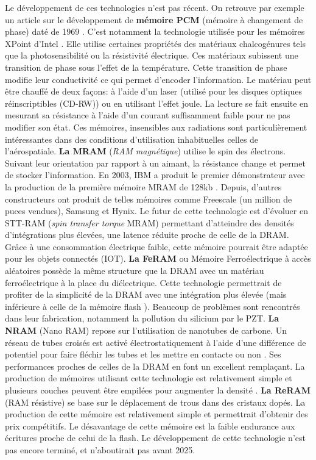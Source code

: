         Le développement de ces technologies n'est pas récent. On retrouve par exemple un article sur le développement de \textbf{mémoire PCM} (mémoire à changement de phase) daté de 1969 \cite{Sie1969}. C'est notamment la technologie utilisée pour les mémoires XPoint d'Intel \cite{Handy2015}. Elle utilise certaines propriétés des matériaux chalcogénures tels que la photosensibilité ou la résistivité électrique. Ces matériaux subissent une transition de phase sous l'effet de la température. Cette transition de phase modifie leur conductivité ce qui permet d'encoder l'information. Le matériau peut être chauffé de deux façons: à l'aide d'un laser (utilisé pour les disques optiques réinscriptibles (CD-RW)) ou en utilisant l'effet joule. La lecture se fait ensuite en mesurant sa résistance à l'aide d'un courant suffisamment faible pour ne pas modifier son état. Ces mémoires, insensibles aux radiations sont particulièrement intéressantes dans des conditions d'utilisation inhabituelles celles de l'aérospatiale. \textbf{La MRAM} (\textit{RAM magnétique}) utilise le spin des électrons.  Suivant leur orientation par rapport à un aimant, la résistance change et permet de stocker l'information. En 2003, IBM a produit le premier démonstrateur avec la production de la première mémoire MRAM de 128kb  \cite{Bette2003}. Depuis, d'autres constructeurs ont produit de telles mémoires comme Freescale (un million de puces vendues), Samsung et Hynix. Le futur de cette technologie est d'évoluer en STT-RAM \cite{Alvarez-Herault2010} (\textit{spin transfer torque} MRAM) permettant d'atteindre des densités d'intégrations plus élevées, une latence réduite proche de celle de la DRAM. Grâce à une consommation électrique faible, cette mémoire pourrait être adaptée pour les objets connectés (IOT). \textbf{La FeRAM} ou Mémoire Ferroélectrique à accès aléatoires possède la même structure que la DRAM avec un matériau ferroélectrique à la place du diélectrique. Cette technologie permettrait de profiter de la simplicité de la DRAM avec une intégration plus élevée (mais inférieure à celle de la mémoire flash \cite{Alvarez-Herault2010}). Beaucoup de problèmes sont rencontrés dans leur fabrication, notamment la pollution du silicium par le PZT. \textbf{La NRAM} (Nano RAM) repose sur l'utilisation de nanotubes de carbone. Un réseau de tubes croisés est activé électrostatiquement à l'aide d'une différence de potentiel pour faire fléchir les tubes et les mettre en contacte ou non \cite{Ricart2008}. Ses performances proches de celles de la DRAM en font un excellent remplaçant. La production de mémoires utilisant cette technologie est relativement simple et plusieurs couches peuvent être empilées pour augmenter la densité \cite{Gervasi2019}. \textbf{La ReRAM} (RAM résistive) se base sur le déplacement de trous dans des cristaux dopés. La production de cette mémoire est relativement simple et permettrait d'obtenir des prix compétitifs. Le désavantage de cette mémoire est la faible endurance aux écritures proche de celui de la flash. Le développement de cette technologie n'est pas encore terminé, et n'aboutirait pas avant 2025.
        

